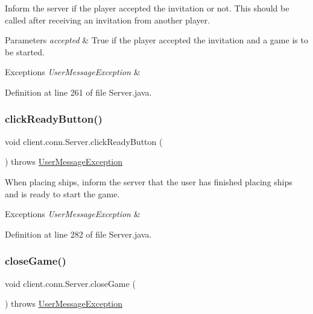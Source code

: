 Inform the server if the player accepted the invitation or not. This should be called after receiving an invitation from another player. 
\begin{DoxyParams}{Parameters}
{\em accepted} & True if the player accepted the invitation and a game is to be started. \\
\hline
\end{DoxyParams}

\begin{DoxyExceptions}{Exceptions}
{\em User\+Message\+Exception} & \\
\hline
\end{DoxyExceptions}


Definition at line 261 of file Server.\+java.

\hypertarget{classclient_1_1conn_1_1_server_a7e54680c0fb053bee969c41f093aa5c4}{}\label{classclient_1_1conn_1_1_server_a7e54680c0fb053bee969c41f093aa5c4} 
\subsubsection{\texorpdfstring{click\+Ready\+Button()}{clickReadyButton()}}
{\footnotesize\ttfamily void client.\+conn.\+Server.\+click\+Ready\+Button (\begin{DoxyParamCaption}{ }\end{DoxyParamCaption}) throws \hyperlink{classpt_1_1up_1_1fe_1_1lpro1613_1_1sharedlib_1_1exceptions_1_1_user_message_exception}{User\+Message\+Exception}}

When placing ships, inform the server that the user has finished placing ships and is ready to start the game. 
\begin{DoxyExceptions}{Exceptions}
{\em User\+Message\+Exception} & \\
\hline
\end{DoxyExceptions}


Definition at line 282 of file Server.\+java.

\hypertarget{classclient_1_1conn_1_1_server_a5d1f1961306d3e06c895abc90dfddf9f}{}\label{classclient_1_1conn_1_1_server_a5d1f1961306d3e06c895abc90dfddf9f} 
\subsubsection{\texorpdfstring{close\+Game()}{closeGame()}}
{\footnotesize\ttfamily void client.\+conn.\+Server.\+close\+Game (\begin{DoxyParamCaption}{ }\end{DoxyParamCaption}) throws \hyperlink{classpt_1_1up_1_1fe_1_1lpro1613_1_1sharedlib_1_1exceptions_1_1_user_message_exception}{User\+Message\+Exception}}

